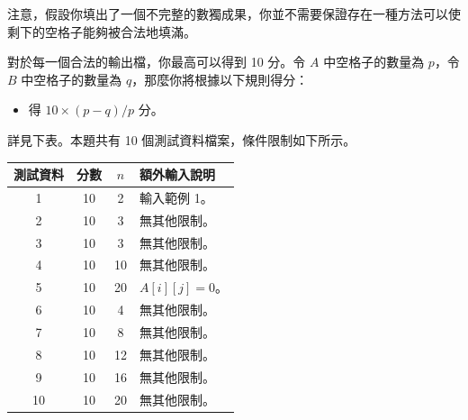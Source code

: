 注意，假設你填出了一個不完整的數獨成果，你並不需要保證存在一種方法可以使剩下的空格子能夠被合法地填滿。

對於每一個合法的輸出檔，你最高可以得到 10 分。令 $A$ 中空格子的數量為 $p$，令 $B$ 中空格子的數量為 $q$，那麼你將根據以下規則得分：

\begin{itemize}
    \item 得 $10\times (p-q)/p$ 分。
\end{itemize}

詳見下表。本題共有 10 個測試資料檔案，條件限制如下所示。

\begin{center}
    \begin{tabular}[t]{@{}cccl@{}}
    \toprule
    測試資料 & 分數 & $n$ & 額外輸入說明\\
    \midrule
    1 & 10 & 2 & 輸入範例 1。\\
    2 & 10 & 3 & 無其他限制。\\
    3 & 10 & 3 & 無其他限制。\\
    4 & 10 & 10 & 無其他限制。\\
    5 & 10 & 20 & $A[i][j]=0$。\\
    6 & 10 & 4 & 無其他限制。\\
    7 & 10 & 8 & 無其他限制。\\
    8 & 10 & 12 & 無其他限制。\\
    9 & 10 & 16 & 無其他限制。\\
    10 & 10 & 20 & 無其他限制。\\
    \bottomrule
    \end{tabular}
\end{center}


